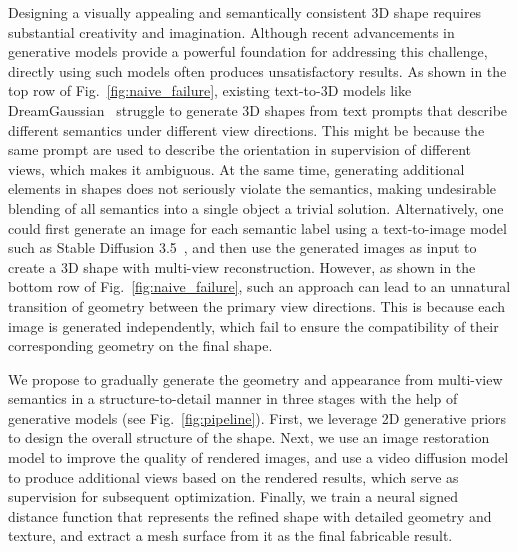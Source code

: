 

Designing a visually appealing and semantically consistent 3D shape requires substantial creativity and imagination. Although recent advancements in generative models provide a powerful foundation for addressing this challenge, directly using such models often produces unsatisfactory results. As shown in the top row of Fig.~\ref{fig:naive_failure}, existing text-to-3D models like DreamGaussian~\cite{tang2023dreamgaussian} struggle to generate 3D shapes from text prompts that describe different semantics under different view directions. This might be because the same prompt are used to describe the orientation in supervision of different views, which makes it ambiguous. At the same time, generating additional elements in shapes does not seriously violate the semantics, making undesirable blending of all semantics into a single object a trivial solution. Alternatively, one could first generate an image for each semantic label using a text-to-image model such as Stable Diffusion 3.5~\cite{sd35}, and then use the generated images as input to create a 3D shape with multi-view reconstruction. However, as shown in the bottom row of Fig.~\ref{fig:naive_failure}, such an approach can lead to an unnatural transition of geometry between the primary view directions. This is because each image is generated independently, which fail to ensure the compatibility of their corresponding geometry on the final shape. 

We propose to gradually generate the geometry and appearance from multi-view semantics in a structure-to-detail manner in three stages with the help of generative models (see Fig.~\ref{fig:pipeline}). First, we leverage 2D generative priors to design the overall structure of the shape. Next, we use an image restoration model to improve the quality of rendered images, and use a video diffusion model to produce additional views based on the rendered results, which serve as supervision for subsequent optimization. Finally, we train a neural signed distance function that represents the refined shape with detailed geometry and texture, and extract a mesh surface from it as the final fabricable result.

